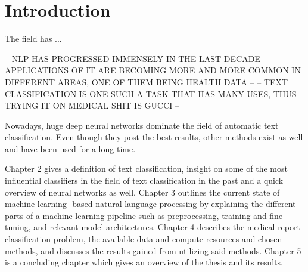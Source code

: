 \chapter{Introduction} \label{Introduction}

The field has ...

-- NLP HAS PROGRESSED IMMENSELY IN THE LAST DECADE --
-- APPLICATIONS OF IT ARE BECOMING MORE AND MORE COMMON IN DIFFERENT AREAS, ONE OF THEM BEING HEALTH DATA --
-- TEXT CLASSIFICATION IS ONE SUCH A TASK THAT HAS MANY USES, THUS TRYING IT ON MEDICAL SHIT IS GUCCI --


Nowadays, huge deep neural networks dominate the field of automatic text classification.
Even though they post the best results, other methods exist as well and have been used for a long time.



Chapter 2 gives a definition of text classification, insight on some of the most influential classifiers in the field of text classification in the past and a quick overview of neural networks as well.
Chapter 3 outlines the current state of machine learning -based natural language processing by explaining the different parts of a machine learning pipeline such as preprocessing, training and fine-tuning, and relevant model architectures.
Chapter 4 describes the medical report classification problem, the available data and compute resources and chosen methods, and discusses the results gained from utilizing said methods.
Chapter 5 is a concluding chapter which gives an overview of the thesis and its results.
